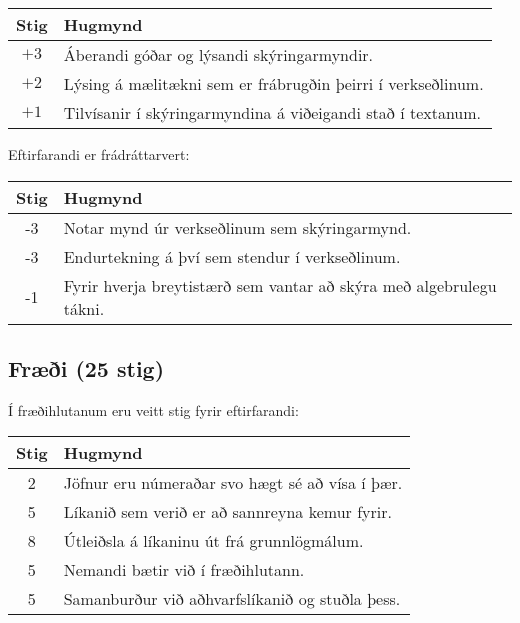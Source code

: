 \begin{tcolorbox}
\begin{table}[H]
    \centering
    \begin{tabular}{|c|l|}
    \hline
       \textbf{Stig}  & \textbf{Hugmynd}   \\ \hline \hline
       $+3$ & Áberandi góðar og lýsandi skýringarmyndir.  \\ \hline
        $+2$ & Lýsing á mælitækni sem er frábrugðin þeirri í verkseðlinum.  \\ \hline
        $+1$  & Tilvísanir í skýringarmyndina á viðeigandi stað í textanum. \\ \hline
    \end{tabular}
\end{table}

Eftirfarandi er frádráttarvert:

\begin{table}[H]
    \centering
    \begin{tabular}{|c|l|}
    \hline
       \textbf{Stig}  & \textbf{Hugmynd}   \\ \hline \hline
        -3  & Notar mynd úr verkseðlinum sem skýringarmynd. \\ \hline
        -3  & Endurtekning á því sem stendur í verkseðlinum. \\
        \hline
        -1  & Fyrir hverja breytistærð sem vantar að skýra með algebrulegu tákni. \\ \hline
    \end{tabular}
\end{table}



\subsection*{Fræði (25 stig)}

Í fræðihlutanum eru veitt stig fyrir eftirfarandi:

\begin{table}[H]
    \centering
    \begin{tabular}{|c|l|}
    \hline
       \textbf{Stig}  & \textbf{Hugmynd}   \\ \hline \hline
        2  & Jöfnur eru númeraðar svo hægt sé að vísa í þær.  \\ \hline
        5  & Líkanið sem verið er að sannreyna kemur fyrir. \\\hline
        8  & Útleiðsla á líkaninu út frá grunnlögmálum. \\\hline
        5  & Nemandi bætir við í fræðihlutann. \\\hline
        5  & Samanburður við aðhvarfslíkanið og stuðla þess. \\\hline
    \end{tabular}
\end{table}

\end{tcolorbox}

